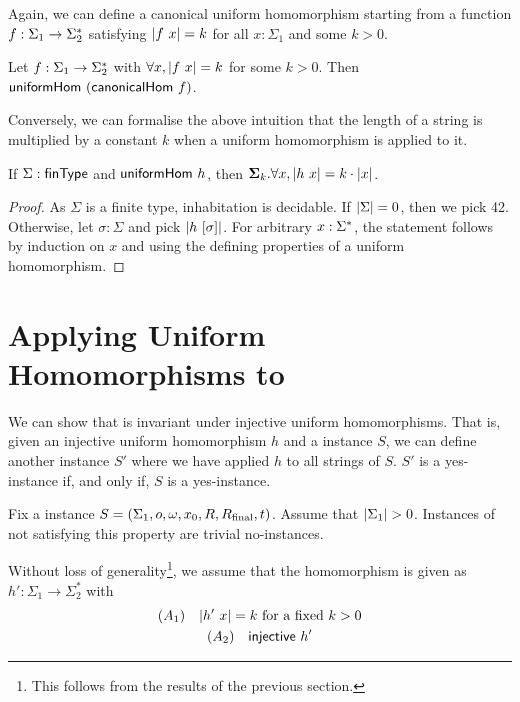 Again, we can define a canonical uniform homomorphism starting from a function $f : \Sigma_1 \rightarrow \Sigma_2^*$ satisfying $|f~x| = k$ for all $x : \Sigma_1$ and some $k > 0$. 
\begin{proposition}$~$\\
  Let $f : \Sigma_1 \rightarrow \Sigma_2^*$ with $\forall x, |f~x| = k$ for some $k > 0$. 
  Then $\textsf{uniformHom}~(\textsf{canonicalHom}~f)$. 
\end{proposition}

Conversely, we can formalise the above intuition that the length of a string is multiplied by a constant $k$ when a uniform homomorphism is applied to it.
\begin{lemma}
  If $\Sigma : \textsf{finType}$ and $\textsf{uniformHom}~h$, then $\bm{\Sigma}_{k}. \forall x, |h~x| = k \cdot |x|$. 
\end{lemma}
\begin{proof}
  As $\Sigma$ is a finite type, inhabitation is decidable. If $|\Sigma| = 0$, then we pick 42. 
  Otherwise, let $\sigma : \Sigma$ and pick $|h~[\sigma]|$. 
  For arbitrary $x : \Sigma^*$, the statement follows by induction on $x$ and using the defining properties of a uniform homomorphism.
\end{proof}

\section{Applying Uniform Homomorphisms to \PR{}}\label{sec:unif_hom_pr}
We can show that \PR{} is invariant under injective uniform homomorphisms. That is, given an injective uniform homomorphism $h$ and a \PR{} instance $S$, we can define another \PR{} instance $S'$ where we have applied $h$ to all strings of $S$. $S'$ is a yes-instance if, and only if, $S$ is a yes-instance. 

Fix a \PR{} instance $S = (\Sigma_1, o, \omega, x_0, R, R_{\text{final}}, t)$. 
Assume that $|\Sigma_1| > 0$. Instances of \PR{} not satisfying this property are trivial no-instances. 

Without loss of generality\footnote{This follows from the results of the previous section.}, we assume that the homomorphism is given as $h' : \Sigma_1 \rightarrow \Sigma_2^*$ with 
\begin{gather*}
  (A_1) \quad |h'~x| = k~\text{for a fixed } k > 0 \\
  (A_2) \quad \textsf{injective}~h'
\end{gather*}

